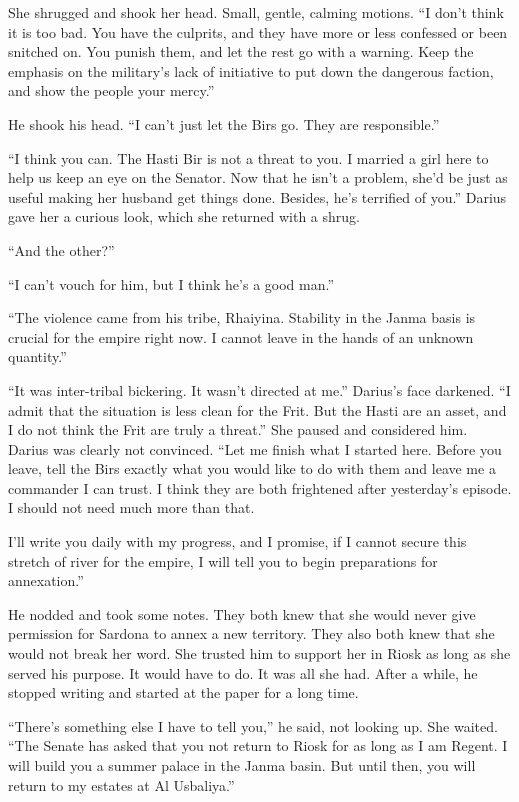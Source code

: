 \documentclass{article}
\begin{document}
	She shrugged and shook her head. Small, gentle, calming motions. “I don’t think it is too bad. You have the culprits, and they have more or less confessed or been snitched on. You punish them, and let the rest go with a warning. Keep the emphasis on the military's lack of initiative to put down the dangerous faction, and show the people your mercy.”
	
	He shook his head. “I can’t just let the Birs go. They are responsible.”
	
	“I think you can. The Hasti Bir is not a threat to you. I married a girl here to help us keep an eye on the Senator. Now that he isn’t a problem, she’d be just as useful making her husband get things done. Besides, he’s terrified of you.” Darius gave her a curious look, which she returned with a shrug. 
	
	“And the other?”
	
	“I can’t vouch for him, but I think he’s a good man.”
	
	“The violence came from his tribe, Rhaiyina. Stability in the Janma basis is crucial for the empire right now. I cannot leave in the hands of an unknown quantity.” 
	
	“It was inter-tribal bickering. It wasn’t directed at me.” Darius’s face darkened. “I admit that the situation is less clean for the Frit. But the Hasti are an asset, and I do not think the Frit are truly a threat.” She paused and considered him. Darius was clearly not convinced. “Let me finish what I started here. Before you leave, tell the Birs exactly what you would like to do with them and leave me a commander I can trust. I think they are both frightened after yesterday’s episode. I should not need much more than that. 
	
	I’ll write you daily with my progress, and I promise, if I cannot secure this stretch of river for the empire, I will tell you to begin preparations for annexation.”
	
	He nodded and took some notes. They both knew that she would never give permission for Sardona to annex a new territory. They also both knew that she would not break her word. She trusted him to support her in Riosk as long as she served his purpose. It would have to do. It was all she had. After a while, he stopped writing and started at the paper for a long time.
	
	“There’s something else I have to tell you,” he said, not looking up. She waited. “The Senate has asked that you not return to Riosk for as long as I am Regent. I will build you a summer palace in the Janma basin. But until then, you will return to my estates at Al Usbaliya.”
	
\end{document}
